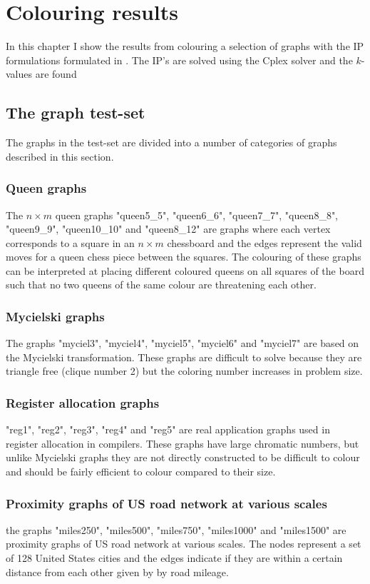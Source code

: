 \chapter{Colouring results}
In this chapter I show the results from colouring a selection of graphs with the IP formulations formulated in . The IP's are solved using the Cplex solver and the $k$-values are found 
\section{The graph test-set}
The graphs in the test-set are divided into a number of categories of graphs described in this section.
\subsection{Queen graphs}
The $n\times m$ queen graphs "queen5\_5", "queen6\_6", "queen7\_7", "queen8\_8", "queen9\_9", "queen10\_10" and "queen8\_12" are graphs where each vertex corresponds to a square in an $n \times m$ chessboard and the edges represent the valid moves for a queen chess piece between the squares. The colouring of these graphs can be interpreted at placing different coloured queens on all squares of the board such that no two queens of the same colour are threatening each other.
\subsection{Mycielski graphs}
The graphs "myciel3", "myciel4", "myciel5", "myciel6" and "myciel7" are based on the Mycielski transformation. These graphs are difficult to solve because they are triangle free (clique number 2) but the coloring number increases in problem size.
\subsection{Register allocation graphs}
"reg1", "reg2", "reg3", "reg4" and "reg5" are real application graphs used in register allocation in compilers. These graphs have large chromatic numbers, but unlike Mycielski graphs they are not directly constructed to be difficult to colour and should be fairly efficient to colour compared to their size.
\subsection{Proximity graphs of US road network at various scales}
the graphs "miles250", "miles500", "miles750", "miles1000" and "miles1500" are proximity graphs of US road network at various scales. The nodes represent a set of 128 United States cities and the edges indicate if they are within a certain distance from each other given by by road mileage.

